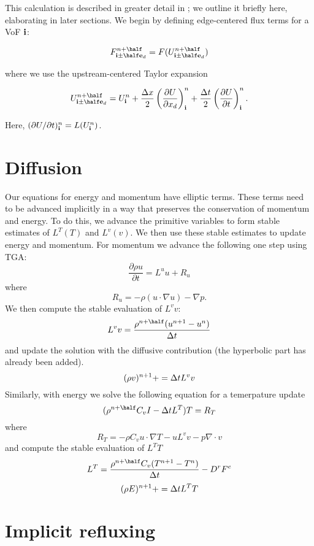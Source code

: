 This calculation is described in greater detail in \cite{???}; we outline it 
briefly here, elaborating in later sections. We begin by defining edge-centered 
flux terms for a VoF ${\bf i}$:

\begin{equation}
F^{n+\half}_{\ib\pm\half\eb_d} = F(U^{n+\half}_{\ib\pm\half\eb_d}) \label{eq:edgeCenteredFluxes}
\end{equation}

\noindent
where we use the upstream-centered Taylor expansion

\begin{equation}
U^{n+\half}_{\ib\pm\half\eb_d} = U^n_\ib + \frac{\dx}{2}\left(\ddxd{U}\right)^n_\ib + 
                                 \frac{\dt}{2}\left(\ddt{U}\right)^n_\ib. \label{eq:edgeCenteredU}
\end{equation}

\noindent
Here, $(\partial U/\partial t)^n_{\bf i} = L(U^n_{\bf i})$.

\section{Diffusion\label{sec:Diffusion}}

Our equations for energy and momentum have elliptic terms.   These
terms need to be advanced implicitly in a way that preserves the
conservation of momentum and energy.   To do this, we advance the
primitive variables to form stable estimates of $L^T(T)$ and $L^v(v)$.
We then use these stable estimates to update energy and momentum.
For momentum we advance the following one step using TGA:
$$
\frac{\partial \rho u}{\partial t} = L^u u + R_u
$$
where 
$$
R_u = -\rho(u \cdot \nabla u) - \nabla p.
$$
We then compute the stable evaluation of $L^v v$:
$$
L^v v = \frac{\rho^{n+\half}(u^{n+1}-u^n)}{\dt}
$$
and update the solution  with the diffusive contribution (the
hyperbolic part has already been added).
$$
(\rho v)^{n+1} += {\Delta t} L^v v
$$
Similarly, with energy we solve the following equation for a
temerpature update 
$$
(\rho^{n+\half} C_v I - \dt L^{T}) T = R_T
$$
where
$$
R_T  = -\rho C_v u \cdot \nabla T- u L^v v - p \nabla \cdot v 
$$
and compute the stable evaluation of $L^T T$
$$
L^T = \frac{\rho^{n+\half} C_v(T^{n+1}-T^n)}{\dt} - D^r F^e
$$
$$
(\rho E)^{n+1} += {\Delta t} L^T T
$$
\section{Implicit refluxing}

